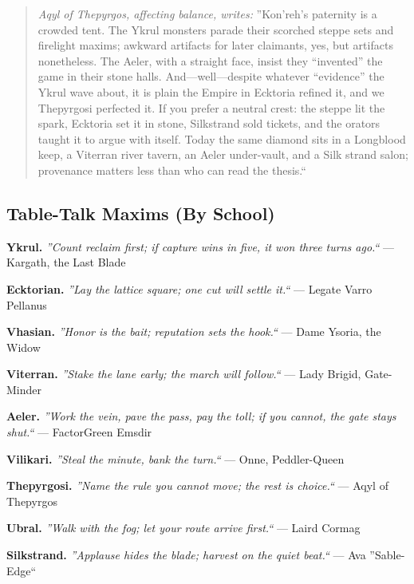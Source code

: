 \documentclass[11pt]{article}
\begin{document}
\begin{quote}\small
\textit{Aqyl of Thepyrgos, affecting balance, writes:} ''Kon'reh's paternity is a crowded tent. The Ykrul monsters parade their scorched steppe sets and firelight maxims; awkward artifacts for later claimants, yes, but artifacts nonetheless. The Aeler, with a straight face, insist they ``invented'' the game in their stone halls. And---well---despite whatever ``evidence'' the Ykrul wave about, it is plain the Empire in Ecktoria refined it, and we Thepyrgosi perfected it. If you prefer a neutral crest: the steppe lit the spark, Ecktoria set it in stone, Silkstrand sold tickets, and the orators taught it to argue with itself. Today the same diamond sits in a Longblood keep, a Viterran river tavern, an Aeler under-vault, and a Silk strand salon; provenance matters less than who can read the thesis.`` 
\end{quote}
\medskip
\subsection*{Table-Talk Maxims (By School)}
\noindent\textbf{Ykrul.} \textit{''Count reclaim first; if capture wins in five, it won three turns ago.``} --- Kargath, the Last Blade

\noindent\textbf{Ecktorian.} \textit{''Lay the lattice square; one cut will settle it.``} --- Legate Varro Pellanus

\noindent\textbf{Vhasian.} \textit{''Honor is the bait; reputation sets the hook.``} --- Dame Ysoria, the Widow

\noindent\textbf{Viterran.} \textit{''Stake the lane early; the march will follow.``} --- Lady Brigid, Gate-Minder

\noindent\textbf{Aeler.} \textit{''Work the vein, pave the pass, pay the toll; if you cannot, the gate stays shut.``} --- Factor\textendash Green Emsdir

\noindent\textbf{Vilikari.} \textit{''Steal the minute, bank the turn.``} --- Onne, Peddler-Queen

\noindent\textbf{Thepyrgosi.} \textit{''Name the rule you cannot move; the rest is choice.``} --- Aqyl of Thepyrgos

\noindent\textbf{Ubral.} \textit{''Walk with the fog; let your route arrive first.``} --- Laird Cormag

\noindent\textbf{Silkstrand.} \textit{''Applause hides the blade; harvest on the quiet beat.``} --- Ava ''Sable-Edge``
\end{document}
